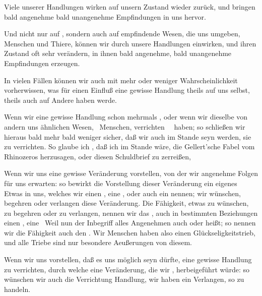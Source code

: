 \begin{aufza}
\item Viele unserer Handlungen wirken auf unsern  Zustand wieder zurück, und bringen bald angenehme bald unangenehme Empfindungen in uns hervor.
\item Und nicht nur auf , sondern auch auf  empfindende Wesen, die uns umgeben, Menschen und Thiere, können wir durch unsere Handlungen einwirken, und ihren Zustand oft sehr verändern, in ihnen bald angenehme, bald unangenehme Empfindungen erzeugen.
\item In vielen Fällen können wir auch mit mehr oder weniger Wahrscheinlichkeit vorherwissen, was für einen Einfluß eine gewisse Handlung theils auf uns selbst, theils auch auf Andere haben werde.
\item Wenn wir eine gewisse Handlung schon mehrmals , oder wenn wir dieselbe von andern uns ähnlichen Wesen, \zB\ Menschen, verrichten ~\ haben; so schließen wir hieraus bald mehr bald weniger sicher, daß wir auch  im Stande seyn werden, sie zu verrichten. So glaube ich \zB , daß ich im Stande wäre, die Gellert'sche Fabel vom Rhinozeros herzusagen, oder diesen Schuldbrief zu zerreißen, \udgl
\item Wenn wir uns eine gewisse Veränderung vorstellen, von der wir angenehme Folgen für uns erwarten: so bewirkt die Vorstellung dieser Veränderung ein eigenes Etwas in uns, welches wir einen , eine , oder auch ein  nennen; wir wünschen, begehren oder verlangen diese Veränderung. Die Fähigkeit, etwas zu wünschen, zu begehren oder zu verlangen, nennen wir das , auch in bestimmten Beziehungen einen , eine  \udgl\ Weil nun der Inbegriff alles Angenehmen auch  oder  heißt; so nennen wir die Fähigkeit  auch den . Wir Menschen haben also einen Glückseligkeitstrieb, und alle  Triebe sind nur besondere Aeußerungen von diesem.
\item Wenn wir uns vorstellen, daß es uns möglich seyn dürfte, eine gewisse Handlung zu verrichten, durch welche eine Veränderung, die wir , herbeigeführt würde: so wünschen wir auch die Verrichtung  Handlung, wir haben ein Verlangen, so zu handeln.

\end{aufza}

